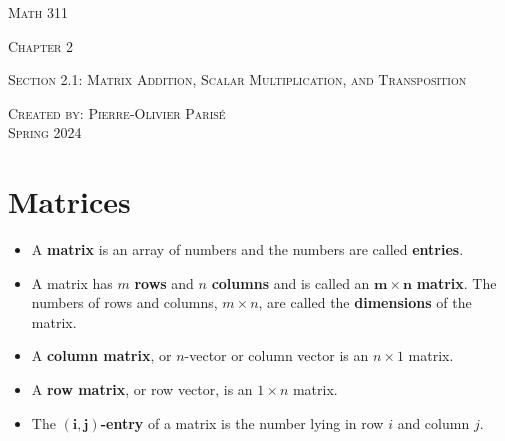 \documentclass[20pt,a4paper]{extarticle}
\newcounter{definition}[section]
\begin{document}
\thispagestyle{empty}

\begin{center}
\vspace*{2.5cm}

{\Huge \textsc{Math 311}}

\vspace*{1.5cm}

{\LARGE \textsc{Chapter 2}} 

\vspace*{0.75cm}

\noindent\textsc{Section 2.1: Matrix Addition, Scalar Multiplication, and Transposition}

\vspace*{0.75cm}

\tableofcontents

\vfill

\noindent \textsc{Created by: Pierre-Olivier Paris{\'e}} \\
\textsc{Spring 2024}
\end{center}

\newpage

\section{Matrices}

\begin{definition}
\begin{itemize}
	\item A \textbf{matrix} is an array of numbers and the numbers are called \textbf{entries}. 
	\item A matrix has $m$ \textbf{rows} and $n$ \textbf{columns} and is called an $\mathbf{m \times n}$ \textbf{matrix}. The numbers of rows and columns, $m \times n$, are called the \textbf{dimensions} of the matrix.
	\item A \textbf{column matrix}, or $n$-vector or column vector is an $n \times 1$ matrix.
	\item A \textbf{row matrix}, or row vector, is an $1 \times n$ matrix.
	\item The $\mathbf{(i, j)}$\textbf{-entry} of a matrix is the number lying in row $i$ and column $j$.
\end{itemize}
\end{definition}
\end{document}
